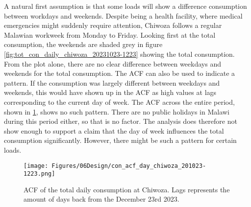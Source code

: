 A natural first assumption is that some loads will show a difference consumption between workdays and weekends. Despite being a health facility, where medical emergencies might suddenly require attention, Chiwoza follows a regular Malawian workweek from Monday to Friday. Looking first at the total consumption, the weekends are shaded grey in figure \ref{fig:tot_con_daily_chiwoza_20231023-1223} showing the total consumption. From the plot alone, there are no clear difference between weekdays and weekends for the total consumption. The ACF can also be used to indicate a pattern. If the consumption was largely different between weekdays and weekends, this would have shown up in the ACF as high values at lags corresponding to the current day of week. The ACF across the entire period, shown in \ref{fig:con_acf_day_chiwoza_201023-1223}, shows no such pattern. There are no public holidays in Malawi during this period either, so that is no factor. The analysis does therefore not show enough to support a claim that the day of week influences the total consumption significantly. However, there might be such a pattern for certain loads. \\

\begin{figure}
    \centering
    \texttt{[image: Figures/06Design/con\_acf\_day\_chiwoza\_201023-1223.png]}
    \caption[ACF Daily consumption Chiwoza 20231023-1223]{ACF of the total daily consumption at Chiwoza. Lags represents the amount of days back from the December 23rd 2023.}
    \label{fig:con_acf_day_chiwoza_201023-1223}
\end{figure}

